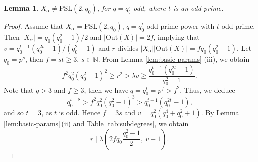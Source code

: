 \documentclass[a4paper,twopage,reqno,12pt]{amsart}
\newtheorem{lemma}[theorem]{Lemma}
\theoremstyle{definition}
\numberwithin{equation}{section}
\newcommand{\PSL}{\mathrm{PSL}}
\newcommand{\Out}{\mathrm{Out}}
\begin{document}
\begin{lemma}\label{case2}
$X_{\alpha}\neq \mathrm{PSL}(2,q_0)$, for $q=q_0^t$ odd, where $t$ is an odd prime.
\end{lemma}

\begin{proof}
Assume that $X_\alpha=\PSL(2,q_0)$, $q=q_0^t$ odd prime power with $t$ odd prime.
Then $|X_\alpha|=q_0(q_0^2-1)/2$ and $|\Out(X)|=2f$, 
implying that $v=q_0^{t-1}(q_0^{2t}-1)/(q_0^2-1)$ and $r$ divides $|X_\alpha||\Out(X)|=fq_0(q_0^2-1).$
Let $q_0=p^s$, then $f=st\ge 3$, $s\in\mathbb N$.
From Lemma \ref{lem:basic-params} (iii), we obtain 
\[
f^2q_0^2(q_0^2-1)^2\ge r^2>\lambda v \ge\frac{q_0^{t-1}(q_0^{2t}-1)}{q_0^2-1}.
\]
Note that $q>3$ and $f\ge 3$, then we have $q=q_0^t=p^f>f^2$.
Thus, we deduce 
\[
q_0^{t+8}>f^2q_0^2(q_0^2-1)^3> q_0^{t-1}(q_0^{2t}-1)\text{,}     
\]
and so $t=3$, as $t$ is odd.
Hence $f=3s$ and $v=q_0^2(q_0^4+q_0^2+1).$ 
By Lemma \ref{lem:basic-params}\,(ii) and  Table \ref{tab:subdegrees}, we obtain
\[
    r\mid \lambda \left(2fq_0\frac{q_0^2 -1}{2}, \ v-1 \right)\text{.}
\]
 

\end{proof}
\end{document}
